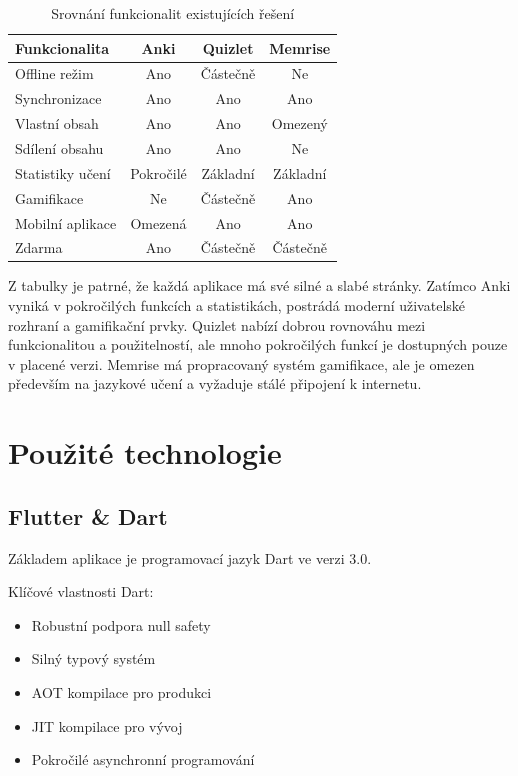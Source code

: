 \documentclass[12pt, a4paper, twoside, openright]{report}
\begin{document}
	\begin{table}[h]
		\centering
		\begin{tabular}{lccc}
			\toprule
			\textbf{Funkcionalita} & \textbf{Anki} & \textbf{Quizlet} & \textbf{Memrise} \\
			\midrule
			Offline režim & Ano & Částečně & Ne \\
			Synchronizace & Ano & Ano & Ano \\
			Vlastní obsah & Ano & Ano & Omezený \\
			Sdílení obsahu & Ano & Ano & Ne \\
			Statistiky učení & Pokročilé & Základní & Základní \\
			Gamifikace & Ne & Částečně & Ano \\
			Mobilní aplikace & Omezená & Ano & Ano \\
			Zdarma & Ano & Částečně & Částečně \\
			\bottomrule
		\end{tabular}
		\caption{Srovnání funkcionalit existujících řešení}
		\label{tab:functionality-comparison}
	\end{table}

	Z tabulky je patrné, že každá aplikace má své silné a slabé stránky. Zatímco Anki vyniká v pokročilých funkcích a statistikách, postrádá moderní uživatelské rozhraní a gamifikační prvky. Quizlet nabízí dobrou rovnováhu mezi funkcionalitou a použitelností, ale mnoho pokročilých funkcí je dostupných pouze v placené verzi. Memrise má propracovaný systém gamifikace, ale je omezen především na jazykové učení a vyžaduje stálé připojení k internetu.

\chapter{Použité technologie}
	\section{Flutter \& Dart}
	Základem aplikace je programovací jazyk Dart ve verzi 3.0.

	Klíčové vlastnosti Dart:
	\begin{itemize}
		\item Robustní podpora null safety
		\item Silný typový systém
		\item AOT kompilace pro produkci
		\item JIT kompilace pro vývoj
		\item Pokročilé asynchronní programování
	\end{itemize}
\end{document}
